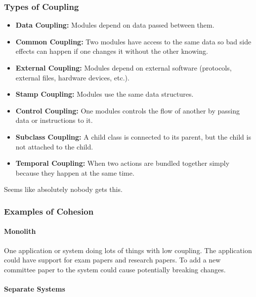 \subsubsection{Types of Coupling}\label{ssub:types_of_coupling}

\begin{itemize}
	\item \textbf{Data Coupling:} Modules depend on data passed between them.
	\item \textbf{Common Coupling:} Two modules have access to the same data so bad side effects can happen if one changes it without the other knowing.
	\item \textbf{External Coupling:} Modules depend on external software (protocols, external files, hardware devices, etc.).
	\item \textbf{Stamp Coupling:} Modules use the same data structures.
	\item \textbf{Control Coupling:} One modules controls the flow of another by passing data or instructions to it.
	\item \textbf{Subclass Coupling:} A child class is connected to its parent, but the child is not attached to the child.
	\item \textbf{Temporal Coupling:} When two actions are bundled together simply because they happen at the same time.
\end{itemize}

\begin{note}
	Seems like absolutely nobody gets this.
\end{note}

\subsubsection{Examples of Cohesion}\label{ssub:examples_of_cohesion}

\paragraph{Monolith}\label{par:monolith}

One application or system doing lots of things with low coupling.
The application could have support for exam papers and research papers.
To add a new committee paper to the system could cause potentially breaking changes.

\paragraph{Separate Systems}\label{par:separate_systems}


